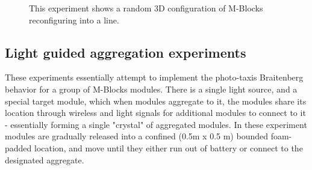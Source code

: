 \begin{figure}[h]
\begin{subfigure}[b]{0.32\linewidth}
	\end{subfigure}
	
	\caption{This experiment shows a random 3D configuration of M-Blocks reconfiguring into a line.}
	
	\label{fig:lineExperiment}
\end{figure}

\subsection{Light guided aggregation experiments}
\label{sec:mblocksExperimentsLight}


These experiments essentially attempt to implement the photo-taxis Braitenberg behavior for a group of M-Blocks modules. There is a single light source, and a special target module, which when modules aggregate to it, the modules share its location through wireless and light signals for additional modules to connect to it - essentially forming a single "crystal" of aggregated modules. In these experiment modules are gradually released into a confined (0.5m x 0.5 m) bounded foam-padded location, and move until they either run out of battery or connect to the designated aggregate.

